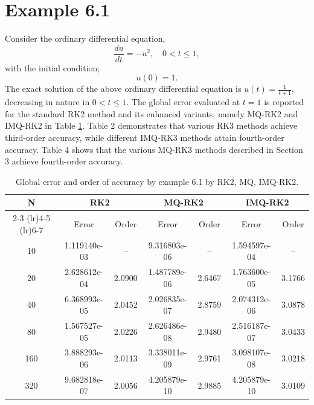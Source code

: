 \documentclass[a4paper, preprint,11pt]{elsarticle}
\numberwithin{equation}{section}
\begin{document}
\section*{Example 6.1}
Consider the ordinary differential equation,
\begin{equation*}
    \frac{du}{dt} = -u^2, \quad 0 < t \leq 1,
\end{equation*}
with the initial condition;
\begin{equation*}
    u(0) = 1.
\end{equation*}
The exact solution of the above ordinary differential equation is $u(t) =\frac{1}{t+1}$, decreasing in nature in $0 < t\leq1$. The global error evaluated at 
$t=1$ is reported for the standard RK2 method and its enhanced variants, namely MQ-RK2 and IMQ-RK2 in Table \ref{tab:error_order_two}. Table 2 demonstrates that various RK3 methods achieve third-order accuracy, while different IMQ-RK3 methods attain fourth-order accuracy. Table 4 shows that the various MQ-RK3 methods described in Section 3 achieve fourth-order accuracy.
\begin{table}[htbp!]
    \centering
     \caption{Global error and order of accuracy by example 6.1 by RK2, MQ, IMQ-RK2.}
    \begin{tabular}{c c c c c c c}
        \toprule
        N & \multicolumn{2}{c}{RK2} & \multicolumn{2}{c}{MQ-RK2} & \multicolumn{2}{c}{IMQ-RK2} \\
        \cmidrule(lr){2-3} \cmidrule(lr){4-5} \cmidrule(lr){6-7}
          & Error & Order & Error & Order & Error & Order\\
        \midrule
        10  & 1.119140e-03   & --   & 9.316803e-06 & -- & 1.594597e-04  & --   \\
        20  & 2.628612e-04  & 2.0900 & 1.487789e-06  & 2.6467 & 1.763600e-05  & 3.1766 \\
        40  &  6.368993e-05  & 2.0452 & 2.026835e-07 & 2.8759 & 2.074312e-06 & 3.0878 \\
        80  & 1.567527e-05  & 2.0226 & 2.626486e-08 &2.9480& 2.516187e-07  & 3.0433 \\
        160 & 3.888293e-06 & 2.0113 & 3.338011e-09  & 2.9761  &3.098107e-08    & 3.0218 \\
        320 & 9.682818e-07 & 2.0056 &  4.205879e-10   & 2.9885 & 4.205879e-10 & 3.0109 \\
        \bottomrule
    \end{tabular}
    \label{tab:error_order_two}
\end{table}
\end{document}
